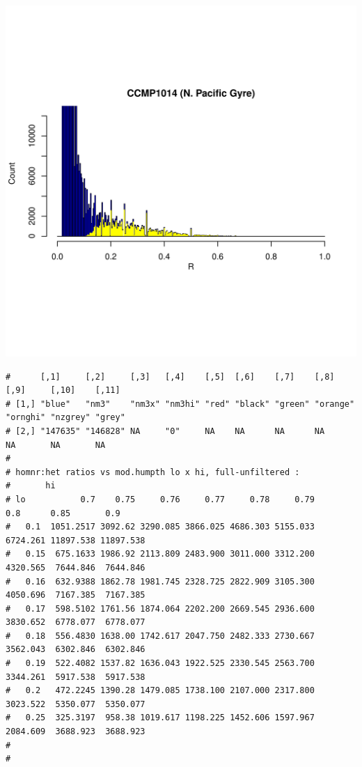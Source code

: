 \documentclass{article}\usepackage[]{graphicx}\usepackage[]{color}
\makeatletter
\def\maxwidth{ %
  \ifdim\Gin@nat@width>\linewidth
    \linewidth
  \else
    \Gin@nat@width
  \fi
}
\newenvironment{kframe}{%
 \def\at@end@of@kframe{}%
 \ifinner\ifhmode%
  \def\at@end@of@kframe{\end{minipage}}%
  \begin{minipage}{\columnwidth}%
 \fi\fi%
 \def\FrameCommand##1{\hskip\@totalleftmargin \hskip-\fboxsep
 \colorbox{shadecolor}{##1}\hskip-\fboxsep
     \hskip-\linewidth \hskip-\@totalleftmargin \hskip\columnwidth}%
 \MakeFramed {\advance\hsize-\width
   \@totalleftmargin\z@ \linewidth\hsize
   \@setminipage}}%
 {\par\unskip\endMakeFramed%
 \at@end@of@kframe}
\newenvironment{knitrout}{}{} %
\makeatother
\begin{document}
\begin{knitrout}
\includegraphics[width=\maxwidth]{FigS7-hwe-histo-figs-knitr/unnamed-chunk-10-7} 
\begin{kframe}\begin{verbatim}
#      [,1]     [,2]     [,3]   [,4]    [,5]  [,6]    [,7]    [,8]     [,9]     [,10]    [,11] 
# [1,] "blue"   "nm3"    "nm3x" "nm3hi" "red" "black" "green" "orange" "ornghi" "nzgrey" "grey"
# [2,] "147635" "146828" NA     "0"     NA    NA      NA      NA       NA       NA       NA
# 
# homnr:het ratios vs mod.humpth lo x hi, full-unfiltered :
#       hi
# lo           0.7    0.75     0.76     0.77     0.78     0.79      0.8      0.85       0.9
#   0.1  1051.2517 3092.62 3290.085 3866.025 4686.303 5155.033 6724.261 11897.538 11897.538
#   0.15  675.1633 1986.92 2113.809 2483.900 3011.000 3312.200 4320.565  7644.846  7644.846
#   0.16  632.9388 1862.78 1981.745 2328.725 2822.909 3105.300 4050.696  7167.385  7167.385
#   0.17  598.5102 1761.56 1874.064 2202.200 2669.545 2936.600 3830.652  6778.077  6778.077
#   0.18  556.4830 1638.00 1742.617 2047.750 2482.333 2730.667 3562.043  6302.846  6302.846
#   0.19  522.4082 1537.82 1636.043 1922.525 2330.545 2563.700 3344.261  5917.538  5917.538
#   0.2   472.2245 1390.28 1479.085 1738.100 2107.000 2317.800 3023.522  5350.077  5350.077
#   0.25  325.3197  958.38 1019.617 1198.225 1452.606 1597.967 2084.609  3688.923  3688.923
# 
# 

\end{verbatim}
\end{kframe}
\end{knitrout}
\end{document}
